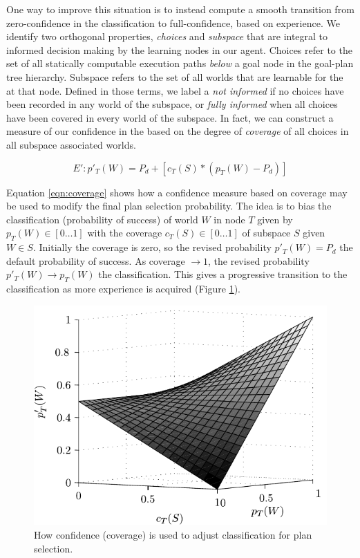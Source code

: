 One way to improve this situation is to instead compute a smooth transition from zero-confidence in the \dt classification to full-confidence, based on experience. We identify two orthogonal properties, \textit{choices} and \textit{subspace} that are integral to informed decision making by the learning nodes in our agent. Choices refer to the set of all statically computable execution paths \textit{below} a goal node in the goal-plan tree hierarchy. Subspace refers to the set of all worlds that are learnable for the \dt at that node. Defined in those terms, we label a \dt \textit{not informed} if no choices have been recorded in any world of the subspace, or \textit{fully informed} when all choices have been covered in every world of the subspace. In fact, we can construct a measure of our confidence in the \dt based on the degree of \textit{coverage} of all choices in all subspace associated worlds.

\begin{equation}
\label{eqn:coverage}   
E': p'_T(W)= P_d + \left[  c_T(S) *  \left( p_T(W) - P_d \right)  \right]
\end{equation}

Equation \ref{eqn:coverage} shows how a confidence measure based on coverage may be used to modify the final plan selection probability. The idea is to bias the \dt classification (probability of success) of world $W$ in node $T$ given by $p_T(W) \in [0 \ldots 1]$ with the coverage $c_T(S) \in [0 \ldots 1]$ of subspace $S$ given $W \in S$. Initially the coverage is zero, so the revised probability $p'_T(W) = P_d$ the default probability of success. As coverage $\rightarrow 1$, the revised probability $p'_T(W) \rightarrow p_T(W)$ the \dt classification. This gives a progressive transition to the \dt classification as more experience is acquired (Figure \ref{fig:coverage-surface}).

\begin{figure}[ht]
   \centering
   \includegraphics[width=\columnwidth]{figs/coverage-surface}
   \caption{How confidence (coverage) is used to adjust \dt classification for plan selection.}
   \label{fig:coverage-surface}
\end{figure}


